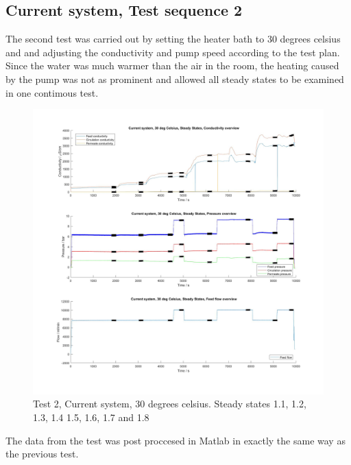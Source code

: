 \newpage

\subsection{Current system, Test sequence 2}

The second test was carried out by setting the heater bath to 30 degrees celsius and and adjusting the conductivity and pump speed according to the test plan. Since the water was much warmer than the air in the room, the heating caused by the pump was not as prominent and allowed all steady states to be examined in one contimous test.

\begin{figure}[H]
    \centering
    \includegraphics[width=1.1\textwidth]{overview30}
    \caption{Test 2, Current system, 30 degrees celsius. Steady states 1.1, 1.2, 1.3, 1.4 1.5, 1.6, 1.7 and 1.8}
    \label{fig:PressConn}
\end{figure}

\newpage



The data from the test was post proccesed in Matlab in exactly the same way as the previous test.

